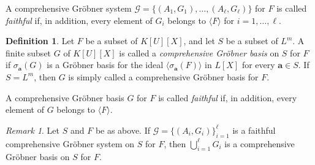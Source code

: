 \documentclass[11pt]{amsart}
\theoremstyle{plain}
\theoremstyle{definition}
\newtheorem{definition}[theorem]{Definition}
\theoremstyle{remark}
\newtheorem{remark}[theorem]{Remark}
\begin{document}
A comprehensive Gr\"obner system $\mathcal{G}=\{(A_1,G_1),\ldots,(A_\ell,G_\ell)\}$ for $F$ is called \emph{faithful} if, in addition, every element of $G_i$ belongs to $\langle F\rangle$ for $i=1,\ldots,\ell$.


\begin{definition}
Let $F$ be a subset of $K[U][X]$, and let $S$ be a subset of $L^m$.
A finite subset $G$ of $K[U][X]$ is called a \emph{comprehensive Gr\"obner basis} on $S$ for $F$ if $\sigma_{\mathbf{a}}(G)$ is a Gr\"obner basis for the ideal $\langle \sigma_{\mathbf{a}}(F)\rangle$ in $L[X]$ for every $\mathbf{a}\in S$.
If $S=L^m$, then $G$ is simply called a comprehensive Gr\"obner basis for $F$.
\end{definition}

A comprehensive Gr\"obner basis $G$ for $F$ is called \emph{faithful} if, in addition, every element of $G$ belongs to $\langle F\rangle$.

\begin{remark}
    Let $S$ and $F$ be as above. If $\mathcal{G}=\{(A_i,G_i)\}_{i=1}^{\ell}$ is a faithful comprehensive Gr\"obner system on $S$ for $F$, then $\bigcup_{i=1}^{\ell}G_i$ is a comprehensive Gr\"obner basis on $S$ for $F$.
\end{remark}
\end{document}
